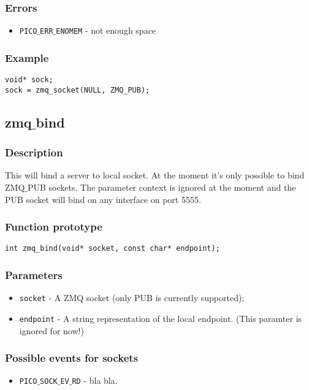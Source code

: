 \subsubsection*{Errors}
\begin{itemize}[noitemsep]
\item \texttt{PICO$\_$ERR$\_$ENOMEM} - not enough space
\end{itemize}

\subsubsection*{Example}
\begin{verbatim}
void* sock;
sock = zmq_socket(NULL, ZMQ_PUB);
\end{verbatim}






\subsection{zmq$\_$bind}

\subsubsection*{Description}
This will bind a server to local socket. At the moment it's only possible to bind ZMQ$\_$PUB sockets. 
The parameter context is ignored at the moment and the PUB socket will bind on any interface on port 5555. 

\subsubsection*{Function prototype}
\begin{verbatim}
int zmq_bind(void* socket, const char* endpoint);
\end{verbatim}

\subsubsection*{Parameters}
\begin{itemize}[noitemsep]
\item \texttt{socket} - A ZMQ socket (only PUB is currently supported);
\item \texttt{endpoint} - A string representation of the local endpoint. (This paramter is ignored for now!)
\end{itemize}

\subsubsection*{Possible events for sockets}
\begin{itemize}[noitemsep]
\item \texttt{PICO$\_$SOCK$\_$EV$\_$RD} - bla bla.
\end{itemize}

